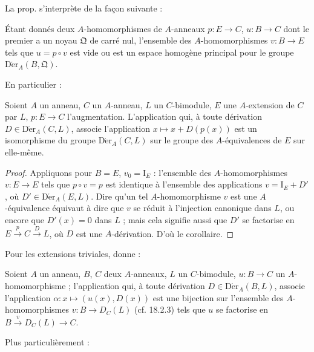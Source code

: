 La prop.  s'interprète de la façon suivante :

\begin{corollary}[20.1.3]
\label{0.20.1.3-fr}
Étant donnés deux $A$-homomorphismes de $A$-anneaux $p:E\to C$,
$u:B\to C$ dont le premier a un noyau $\mathfrak{Q}$ de carré nul,
l'ensemble des $A$-homomorphismes $v:B\to E$ tels que $u=p\circ v$ est vide
ou est un espace homogène principal pour le groupe
$\operatorname{D\acute{e}r}_A(B,\mathfrak{Q})$.
\end{corollary}

En particulier :

\begin{corollary}[20.1.4]
\label{0.20.1.4-fr}
Soient $A$ un anneau, $C$ un $A$-anneau, $L$ un $C$-bimodule, $E$ une
$A$-extension de $C$ par $L$, $p:E\to C$ l'augmentation. L'application qui,
à toute dérivation $D\in\operatorname{D\acute{e}r}_A(C,L)$, associe l'application
$x\mapsto x+D(p(x))$ est un isomorphisme du groupe
$\operatorname{D\acute{e}r}_A(C,L)$ sur le groupe des $A$-équivalences de $E$ sur
elle-même.
\end{corollary}

\begin{proof}
Appliquons  pour $B=E$, $v_0=\mathrm{I}_E$ : l'ensemble
des $A$-homomorphismes $v:E\to E$ tels que $p\circ v=p$ est identique à
l'ensemble des applications $v=\mathrm{I}_E+D'$, où
$D'\in\operatorname{D\acute{e}r}_A(E,L)$. Dire qu'un tel $A$-homomorphisme $v$ est
une $A$-équivalence équivaut à dire que $v$ se réduit à l'injection canonique
dans $L$, ou encore que $D'(x)=0$ dans $L$ ; mais cela signifie aussi que
$D'$ se factorise en $E\xrightarrow{p}C\xrightarrow{D}L$, où $D$ est une
$A$-dérivation. D'où le corollaire.
\end{proof}

Pour les extensions triviales,  donne :

\begin{corollary}[20.1.5]
\label{0.20.1.5-fr}
Soient $A$ un anneau, $B$, $C$ deux $A$-anneaux, $L$ un $C$-bimodule,
$u:B\to C$ un $A$-homomorphisme ; l'application qui, à toute dérivation
$D\in\operatorname{D\acute{e}r}_A(B,L)$, associe l'application
$\alpha:x\mapsto(u(x),D(x))$ est une bijection sur l'ensemble des
$A$-homomorphismes $v:B\to D_C(L)$ (cf. 18.2.3) tels que $u$ se factorise en
$B\xrightarrow{v}D_C(L)\to C$.
\end{corollary}

Plus particulièrement :

